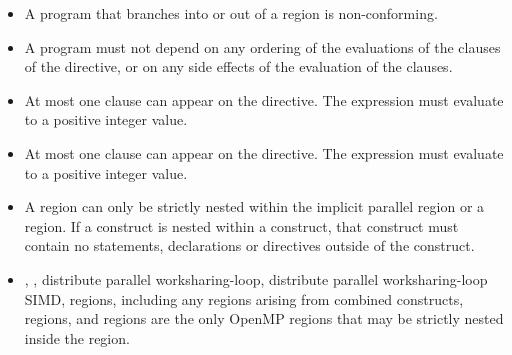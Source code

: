 \begin{itemize}
\item A program that branches into or out of a  region is non-conforming.

\item A program must not depend on any ordering of the evaluations of the clauses of the
 directive, or on any side effects of the evaluation of the clauses.

\item At most one  clause can appear on the directive. The
 expression must evaluate to a positive integer value.

\item At most one  clause can appear on the directive. The 
expression must evaluate to a positive integer value.

\item A  region can only be strictly nested within the implicit parallel region or a  region.
If a  construct is nested within a  construct,
that  construct must contain no statements, declarations or
directives outside of the  construct.

\item {}, , distribute parallel worksharing-loop,
distribute parallel worksharing-loop SIMD,  regions, including any
 regions arising from combined constructs,  regions, and  regions are the only OpenMP regions
that may be strictly nested inside the  region.

\end{itemize}

